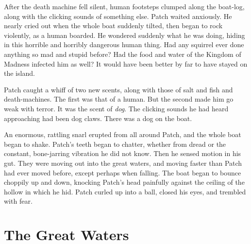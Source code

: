 \documentclass[12pt]{book}
\begin{document}
 After the death machine fell silent, human footsteps clumped along the boat-log, along with the clicking sounds of something else. Patch waited anxiously. He nearly cried out when the whole boat suddenly tilted, then began to rock violently, as a human boarded. He wondered suddenly what he was doing, hiding in this horrible and horribly dangerous human thing. Had any squirrel ever done anything so mad and stupid before? Had the food and water of the Kingdom of Madness infected him as well? It would have been better by far to have stayed on the island.\par
 Patch caught a whiff of two new scents, along with those of salt and fish and death-machines. The first was that of a human. But the second made him go weak with terror. It was the scent of {\it dog}. The clicking sounds he had heard approaching had been dog claws. There was a dog on the boat.\par
 An enormous, rattling snarl erupted from all around Patch, and the whole boat began to shake. Patch's teeth began to chatter, whether from dread or the constant, bone-jarring vibration he did not know. Then he sensed motion in his gut. They were moving out into the great waters, and moving faster than Patch had ever moved before, except perhaps when falling. The boat began to bounce choppily up and down, knocking Patch's head painfully against the ceiling of the hollow in which he hid. Patch curled up into a ball, closed his eyes, and trembled with fear.\par

\section{The Great Waters}
\end{document}
